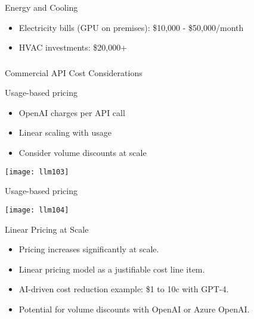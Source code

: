 \begin{frame}[fragile]{Energy and Cooling}
  \begin{itemize}
    \item Electricity bills (GPU on premises): \$10,000 - \$50,000/month
    \item HVAC investments: \$20,000+
  \end{itemize}
\end{frame}

\begin{frame}[fragile]\frametitle{}
\begin{center}
{\Large Commercial API Cost Considerations}
\end{center}
\end{frame}

\begin{frame}[fragile]{Usage-based pricing}
  \begin{itemize}
    \item OpenAI charges per API call
    \item Linear scaling with usage
    \item Consider volume discounts at scale
  \end{itemize}
  
\begin{center}
\texttt{[image: llm103]}


\end{center}	  
\end{frame}

\begin{frame}[fragile]{Usage-based pricing}

\begin{center}
\texttt{[image: llm104]}
\end{center}	  
\end{frame}
\begin{frame}[fragile]{Linear Pricing at Scale}
  \begin{itemize}
    \item Pricing increases significantly at scale.
    \item Linear pricing model as a justifiable cost line item.
    \item AI-driven cost reduction example: \$1 to 10c with GPT-4.
    \item Potential for volume discounts with OpenAI or Azure OpenAI.
  \end{itemize}
\end{frame}

